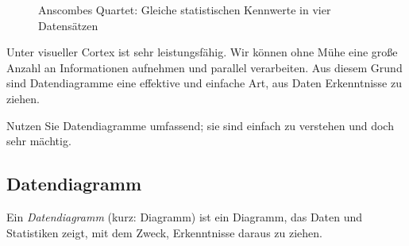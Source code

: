 \documentclass[
  letterpaper,
]{scrbook}
\theoremstyle{definition}
\theoremstyle{definition}
\theoremstyle{definition}
\theoremstyle{remark}
\begin{document}
\begin{figure}


\caption{\label{fig-dino2}Anscombes Quartet: Gleiche statistischen
Kennwerte in vier Datensätzen}

\end{figure}%

Unter visueller Cortex ist sehr leistungsfähig. Wir können ohne Mühe
eine große Anzahl an Informationen aufnehmen und parallel verarbeiten.
Aus diesem Grund sind Datendiagramme eine effektive und einfache Art,
aus Daten Erkenntnisse zu ziehen.

\begin{tcolorbox}[enhanced jigsaw, colbacktitle=quarto-callout-tip-color!10!white, coltitle=black, bottomrule=.15mm, rightrule=.15mm, arc=.35mm, toptitle=1mm, colframe=quarto-callout-tip-color-frame, opacitybacktitle=0.6, left=2mm, leftrule=.75mm, breakable, opacityback=0, bottomtitle=1mm, titlerule=0mm, title=\textcolor{quarto-callout-tip-color}{\faLightbulb}\hspace{0.5em}{Tipp}, colback=white, toprule=.15mm]

Nutzen Sie Datendiagramme umfassend; sie sind einfach zu verstehen und
doch sehr mächtig.

\end{tcolorbox}

\subsection{Datendiagramm}\label{datendiagramm}

Ein \emph{Datendiagramm} (kurz: Diagramm) ist ein Diagramm, das Daten
und Statistiken zeigt, mit dem Zweck, Erkenntnisse daraus zu ziehen.
\end{document}
